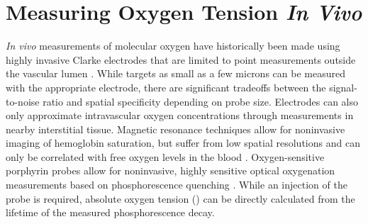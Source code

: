 \section{Measuring Oxygen Tension \textit{In Vivo}}

\textit{In vivo} measurements of molecular oxygen have historically been made using highly invasive Clarke electrodes that are limited to point measurements outside the vascular lumen \cite{Vovenko:1999be, Tsai:2003cc, Roussakis:2015eu}. While targets as small as a few microns can be measured with the appropriate electrode, there are significant tradeoffs between the signal-to-noise ratio and spatial specificity depending on probe size. Electrodes can also only approximate intravascular oxygen concentrations through measurements in nearby interstitial tissue. Magnetic resonance techniques allow for noninvasive imaging of hemoglobin saturation, but suffer from low spatial resolutions and can only be correlated with free oxygen levels in the blood \cite{Roussakis:2015eu, Dunn:2003hg, Hou:2003hb, Liu:2006bt}. Oxygen-sensitive porphyrin probes allow for noninvasive, highly sensitive optical oxygenation measurements based on phosphorescence quenching \cite{Vinogradov:2012tda}. While an injection of the probe is required, absolute oxygen tension () can be directly calculated from the lifetime of the measured phosphorescence decay.


